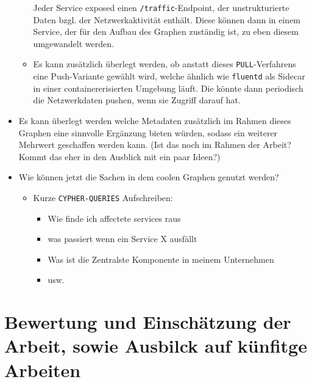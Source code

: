 \documentclass[
	12pt,
	BCOR=5mm,
	DIV=12,
	headinclude=on,
	footinclude=off,
	parskip=half,
	bibliography=totoc,
	listof=entryprefix,
	toc=listof,
	numbers=noenddot,
	plainfootsepline
]{scrreprt}
\begin{document}
\begin{itemize}
\begin{itemize}
		Jeder Service exposed einen \texttt{/traffic}-Endpoint, der unstrukturierte Daten bzgl. der Netzwerkaktivität enthält. Diese können dann in einem Service, der für den Aufbau des Graphen zuständig ist, zu eben diesem umgewandelt werden.
		\item Es kann zusätzlich überlegt werden, ob anstatt dieses \texttt{PULL}-Verfahrens eine Push-Variante gewählt wird, welche ähnlich wie \texttt{fluentd} als Sidecar in einer containererisierten Umgebung läuft. Die könnte dann periodisch die Netzwerkdaten pushen, wenn sie Zugriff darauf hat.
	\end{itemize}
	\item Es kann überlegt werden welche Metadaten zusätzlich im Rahmen dieses Graphen eine sinnvolle Ergänzung bieten würden, sodass ein weiterer Mehrwert geschaffen werden kann. (Ist das noch im Rahmen der Arbeit? Kommt das eher in den Ausblick mit ein paar Ideen?)
	\item Wie können jetzt die Sachen in dem coolen Graphen genutzt werden?
	\begin{itemize}
		\item Kurze \texttt{CYPHER-QUERIES} Aufschreiben:
		\begin{itemize}
			\item Wie finde ich affectete services raus
			\item was passiert wenn ein Service X ausfällt
			\item Was ist die Zentralste Komponente in meinem Unternehmen
			\item usw.
		\end{itemize}
	\end{itemize}
\end{itemize}

\chapter{Bewertung und Einschätzung der Arbeit, sowie Ausbilck auf künfitge Arbeiten}
\clearpage
\ihead{}
\printbibliography[title=Literaturverzeichnis]
\cleardoublepage



\end{document}
